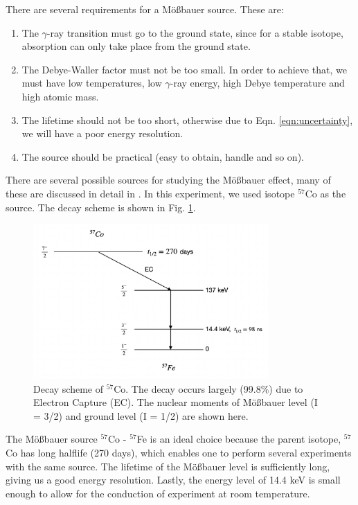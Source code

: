 \documentclass[a4paper]{report}
\numberwithin{equation}{section}
\begin{document}
There are several requirements for a M\"o{\ss}bauer source. These are: 

\begin{enumerate}
		\item The $\gamma$-ray transition must go to the ground state, since for a stable isotope, absorption can only take place from the ground state.
		\item The Debye-Waller factor must not be too small. In order to achieve that, we must have low temperatures, low $\gamma$-ray energy, high Debye temperature and high atomic mass.
		\item The lifetime should not be too short, otherwise due to Eqn. \ref{eqn:uncertainty}, we will have a poor energy resolution.
		\item The source should be practical (easy to obtain, handle and so on).
\end{enumerate}

There are several possible sources for studying the M\"o{\ss}bauer effect, many of these are discussed in detail in \cite{Schatz1996}. In this experiment, we used isotope $^{57}$Co as the source. The decay scheme is shown in Fig. \ref{fig:decay}.

\begin{figure}[htpb]
    \centering
    \includegraphics[width=0.8\textwidth]{source}
    \caption{Decay scheme of $^{57}$Co. The decay occurs largely (99.8\%) due to Electron Capture (EC). The nuclear moments of M\"o{\ss}bauer level (I = 3/2) and ground level (I = 1/2) are shown here.}
    \label{fig:decay}
\end{figure}	

The M\"o{\ss}bauer source $^{57}$Co - $^{57}$Fe is an ideal choice because the parent isotope, $^{57}$Co has long halflife (270 days), which enables one to perform several experiments with the same source. The lifetime of the M\"o{\ss}bauer level is sufficiently long, giving us a good energy resolution. Lastly, the energy level of 14.4 keV is small enough to allow for the conduction of experiment at room temperature. 
\end{document}
